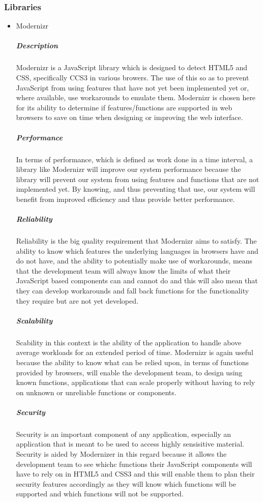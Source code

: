 \documentclass[a4paper,10pt]{article}
\begin{document}
\subsubsection{Libraries}
	\begin{itemize}
		\item Modernizr
			\subparagraph{Description}
			Modernizr is a JavaScript library which is designed to detect HTML5 and CSS, specifically CCS3 in various browers. The use of this so as to prevent JavaScript from using features that have not yet been implemented yet or, where available, use workarounds to emulate them.
			Modernizr is chosen here for its ability to determine if features/functions are supported in web browsers to save on time when designing or improving the web interface.
			\subparagraph{Performance}
			In terms of performance, which is defined as work done in a time interval, a library like Modernizr will improve our system performance because the library will prevent our system from using features and functions that are not implemented yet. By knowing, and thus preventing that use, our system will benefit from improved efficiency and thus provide better performance.
			\subparagraph{Reliability}
			Reliability is the big quality requirement that Modernizr aims to satisfy. The ability to know which features the underlying languages in browsers have and do not have, and the ability to potentially make use of workarounds, means that the development team will always know the limits of what their JavaScript based components can and cannot do and this will also mean that they can develop workarounds and fall back functions for the functionality they require but are not yet developed.
			\subparagraph{Scalability}
			Scability in this context is the ability of the application to handle above average workloads for an extended period of time. Modernizr is again useful because the ability to know what can be relied upon, in terms of functions provided by browsers, will enable the development team, to design using known functions, applications that can scale properly without having to rely on unknown or unreliable functions or components.
			\subparagraph{Security}
			Security is an important component of any application, especially an application that is meant to be used to access highly sensisitive material. Security is aided by Modernizer in this regard because it allows the development team to see whichc functions their JavaScript components will have to rely on in HTML5 and CSS3 and this will enable them to plan their security features accordingly as they will know which functions will be supported and which functions will not be supported.

\end{itemize}
\end{document}
